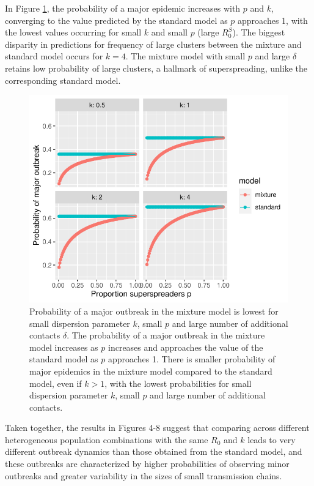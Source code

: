 \documentclass{imammb}
\numberwithin{equation}{section}
\begin{document}
{ 
  In Figure \ref{fig:outbreak}, the probability of a major epidemic increases with $p$ and $k$, converging to the value predicted by the standard model as $p$ approaches 1, with the lowest values occurring for small $k$ and small $p$ (large $R_0^S$). The biggest disparity in predictions for frequency of large clusters between the mixture and standard model occurs for $k=4$. The mixture model with small $p$ and large $\delta$ retains low probability of large clusters, a hallmark of superspreading,  unlike  the corresponding standard model.
  
  \begin{figure}
    \centering
    \includegraphics{Figure5.pdf}
    \caption{ Probability of a major outbreak in the mixture model is lowest for small dispersion parameter $k$, small $p$ and large number of additional contacts $\delta$. The probability of a major outbreak in the mixture model increases as $p$ increases and approaches the value of the standard model as $p$ approaches 1. There is smaller probability of major epidemics in the mixture model compared to the standard model, even if $k>1$, with the lowest probabilities for small dispersion parameter $k$, small $p$ and large number of additional contacts.}
    \label{fig:outbreak}
\end{figure}
  
  Taken together, the results in Figures 4-8 suggest that comparing across different heterogeneous population combinations with the same $R_0$ and $k$ leads to very different outbreak dynamics than those obtained from the standard model, and these outbreaks are characterized by higher probabilities of observing minor outbreaks and greater variability in the sizes of small transmission chains.
  
  }
  
\end{document}
